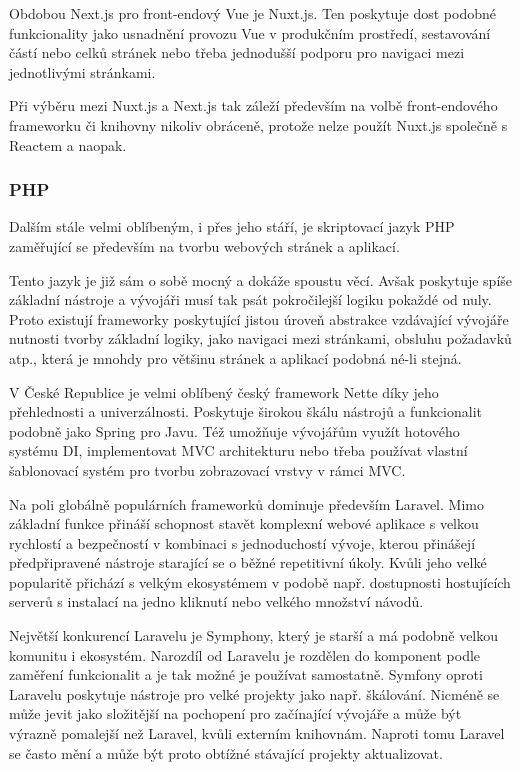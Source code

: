 \begin{itemize}
\begin{itemize}
		Obdobou Next.js pro front-endový Vue je Nuxt.js.
		Ten poskytuje dost podobné funkcionality jako usnadnění provozu Vue v produkčním prostředí, sestavování
		částí nebo celků stránek nebo třeba jednodušší podporu pro navigaci mezi jednotlivými stránkami. \cite{nuxtjs}

		Při výběru mezi Nuxt.js a Next.js tak záleží především na volbě front-endového frameworku či knihovny
		nikoliv obráceně, protože nelze použít Nuxt.js společně s Reactem a naopak.

		\subsubsection{PHP}

		Dalším stále velmi oblíbeným, i přes jeho stáří, je skriptovací jazyk \noindent\Ac{PHP} zaměřující se především na tvorbu
		webových stránek a aplikací. \cite{php}

		Tento jazyk je již sám o sobě mocný a dokáže spoustu věcí.
		Avšak poskytuje spíše základní nástroje a vývojáři musí tak psát pokročilejší logiku pokaždé od nuly.
		Proto existují frameworky poskytující jistou úroveň abstrakce vzdávající vývojáře nutnosti tvorby základní logiky,
		jako navigaci mezi stránkami, obsluhu požadavků atp., která je mnohdy pro většinu stránek a aplikací podobná
		né-li stejná. \cite{best_php_frameworks}

		V České Republice je velmi oblíbený český framework Nette díky jeho přehlednosti a univerzálnosti.
		Poskytuje širokou škálu nástrojů a funkcionalit podobně jako Spring pro Javu.
		Též umožňuje vývojářům využít hotového systému \Ac{DI}, implementovat \Ac{MVC} architekturu nebo třeba používat
		vlastní šablonovací systém pro tvorbu zobrazovací vrstvy v rámci \Ac{MVC}. \cite{proc_pouzivat_nette}

		Na poli globálně populárních frameworků dominuje především Laravel.
		Mimo základní funkce přináší schopnost stavět komplexní webové aplikace s velkou rychlostí a bezpečností
		v kombinaci s jednoduchostí vývoje, kterou přinášejí předpřipravené nástroje starající se o běžné repetitivní
		úkoly.
		Kvůli jeho velké popularitě přichází s velkým ekosystémem v podobě např. dostupnosti hostujících serverů
		s instalací na jedno kliknutí nebo velkého množství návodů. \cite{best_php_frameworks}

		Největší konkurencí Laravelu je Symphony, který je starší a má podobně velkou komunitu i ekosystém.
		Narozdíl od Laravelu je rozdělen do komponent podle zaměření funkcionalit a je tak možné je používat samostatně. \cite{best_php_frameworks}
		Symfony oproti Laravelu poskytuje nástroje pro velké projekty jako např. škálování.
		Nicméně se může jevit jako složitější na pochopení pro začínající vývojáře a může být výrazně pomalejší
		než Laravel, kvůli externím knihovnám.
		Naproti tomu Laravel se často mění a může být proto obtížné stávající projekty aktualizovat.
		\cite{laravel_vs_symfony_in_2021}


\end{itemize}
\end{itemize}
